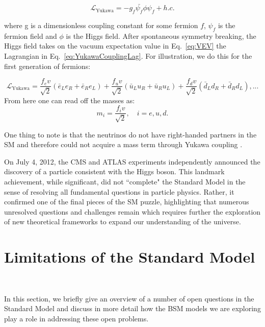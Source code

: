 \begin{equation}
    \label{eq:YukawaCouplingLag}
    \mathcal{L}_{\text{Yukawa}} = -g_f\bar{\psi_f} \phi \psi_f + h.c. 
\end{equation}

where g is a dimensionless coupling constant for some fermion $f$, $\psi_f$ is the fermion field and $\phi$ is the Higgs field. After spontaneous symmetry breaking, the Higgs field takes on the vacuum expectation value in Eq.~\ref{eq:VEV} the Lagrangian in Eq.~\ref{eq:YukawaCouplingLag}. For illustration, we do this for the first generation of fermions:

\begin{equation}
    \label{eq:YukVEV}
    \mathcal{L}_{\text{Yukawa}} =  \frac{f_e v}{\sqrt{2}} \left( \bar{e}_L e_R + \bar{e}_R e_L \right) + \frac{f_u v }{\sqrt{2}} \left( \bar{u}_L u_R + \bar{u}_R u_L \right) +  \frac{f_d v}{\sqrt{2}} \left( \bar{d}_L d_R + \bar{d}_R d_L \right), ...
\end{equation}
From here one can read off the masses as:
\begin{equation}
    \label{eq:FermionMasses}
   m_i = \frac{f_iv}{\sqrt{2}}, \quad i = e, u, d.
\end{equation}

One thing to note is that the neutrinos do not have right-handed partners in the SM and therefore could not acquire a mass term through Yukawa coupling \cite{Martin:1997ns}. 

On July 4, 2012, the CMS and ATLAS experiments independently announced the discovery of a particle consistent with the Higgs boson. This landmark achievement, while significant, did not ``complete" the Standard Model in the sense of resolving all fundamental questions in particle physics. Rather, it confirmed one of the final pieces of the SM puzzle, highlighting that numerous unresolved questions and challenges remain which requires further the exploration of new theoretical frameworks to expand our understanding of the universe.

\section{Limitations of the Standard Model}~\label{sec:SMLimitations}

In this section, we briefly give an overview of a number of open questions in the Standard Model and discuss in more detail how the BSM models we are exploring play a role in addressing these open problems. 

